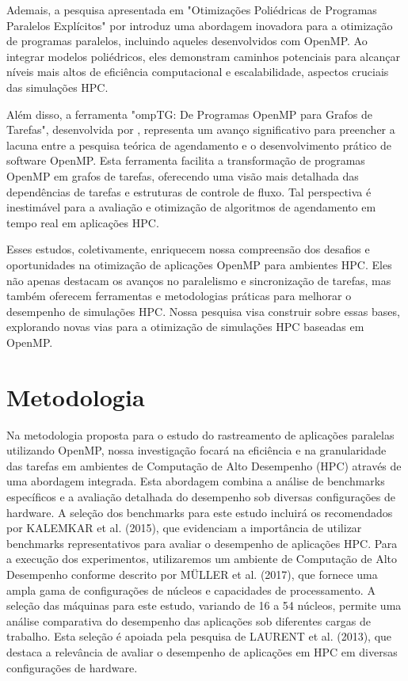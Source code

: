 \documentclass[ppgc,diss]{iiufrgs}
\begin{document}
Ademais, a pesquisa apresentada em "Otimizações Poliédricas de Programas Paralelos Explícitos" por  introduz uma abordagem inovadora para a otimização de programas paralelos, incluindo aqueles desenvolvidos com OpenMP. Ao integrar modelos poliédricos, eles demonstram caminhos potenciais para alcançar níveis mais altos de eficiência computacional e escalabilidade, aspectos cruciais das simulações HPC.

Além disso, a ferramenta "ompTG: De Programas OpenMP para Grafos de Tarefas", desenvolvida por , representa um avanço significativo para preencher a lacuna entre a pesquisa teórica de agendamento e o desenvolvimento prático de software OpenMP. Esta ferramenta facilita a transformação de programas OpenMP em grafos de tarefas, oferecendo uma visão mais detalhada das dependências de tarefas e estruturas de controle de fluxo. Tal perspectiva é inestimável para a avaliação e otimização de algoritmos de agendamento em tempo real em aplicações HPC.

Esses estudos, coletivamente, enriquecem nossa compreensão dos desafios e oportunidades na otimização de aplicações OpenMP para ambientes HPC. Eles não apenas destacam os avanços no paralelismo e sincronização de tarefas, mas também oferecem ferramentas e metodologias práticas para melhorar o desempenho de simulações HPC. Nossa pesquisa visa construir sobre essas bases, explorando novas vias para a otimização de simulações HPC baseadas em OpenMP.



\section{Metodologia}

Na metodologia proposta para o estudo do rastreamento de aplicações paralelas utilizando OpenMP, nossa investigação focará na eficiência e na granularidade das tarefas em ambientes de Computação de Alto Desempenho (HPC) através de uma abordagem integrada. Esta abordagem combina a análise de benchmarks específicos e a avaliação detalhada do desempenho sob diversas configurações de hardware. A seleção dos benchmarks para este estudo incluirá os recomendados por KALEMKAR et al. (2015), que evidenciam a importância de utilizar benchmarks representativos para avaliar o desempenho de aplicações HPC.
Para a execução dos experimentos, utilizaremos um ambiente de Computação de Alto Desempenho conforme descrito por MÜLLER et al. (2017), que fornece uma ampla gama de configurações de núcleos e capacidades de processamento. A seleção das máquinas para este estudo, variando de 16 a 54 núcleos, permite uma análise comparativa do desempenho das aplicações sob diferentes cargas de trabalho. Esta seleção é apoiada pela pesquisa de LAURENT et al. (2013), que destaca a relevância de avaliar o desempenho de aplicações em HPC em diversas configurações de hardware.
\end{document}
